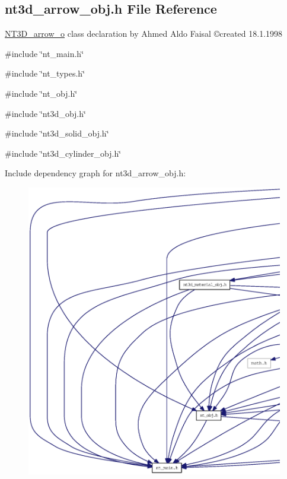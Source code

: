 \subsection{nt3d\_\-arrow\_\-obj.h File Reference}
\label{nt3d__arrow__obj_8h}



\begin{DoxyItemize}
\item \hyperlink{class_n_t3_d__arrow__o}{NT3D\_\-arrow\_\-o} class declaration by Ahmed Aldo Faisal \copyright created 18.1.1998 
\end{DoxyItemize} 


{\ttfamily \#include \char`\"{}nt\_\-main.h\char`\"{}}\par
{\ttfamily \#include \char`\"{}nt\_\-types.h\char`\"{}}\par
{\ttfamily \#include \char`\"{}nt\_\-obj.h\char`\"{}}\par
{\ttfamily \#include \char`\"{}nt3d\_\-obj.h\char`\"{}}\par
{\ttfamily \#include \char`\"{}nt3d\_\-solid\_\-obj.h\char`\"{}}\par
{\ttfamily \#include \char`\"{}nt3d\_\-cylinder\_\-obj.h\char`\"{}}\par
Include dependency graph for nt3d\_\-arrow\_\-obj.h:
\nopagebreak
\begin{figure}[H]
\begin{center}
\leavevmode
\includegraphics[width=400pt]{nt3d__arrow__obj_8h__incl}
\end{center}
\end{figure}
